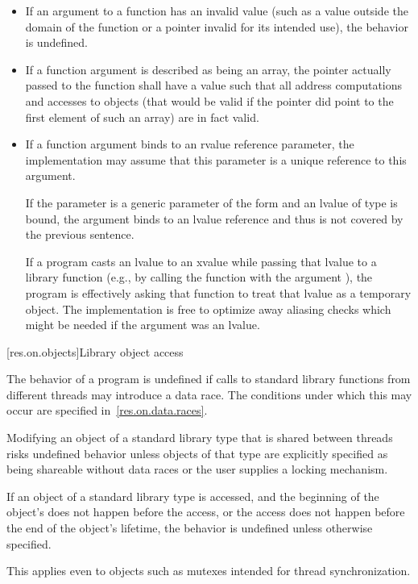 \begin{itemize}
\item
If an argument to a function has an invalid value (such
%
as a value outside the domain of the function or a pointer invalid for its
intended use), the behavior is undefined.
%

\item
If a function argument is described as being an array,
%
the pointer actually passed to the function shall have a value such that all
address computations and accesses to objects (that would be valid if the
pointer did point to the first element of such an array) are in fact valid.

\item
If a function argument binds to an rvalue reference parameter, the implementation may
assume that this parameter is a unique reference to this argument.
\begin{note}
If the parameter is a generic parameter of the form  and an lvalue of type
 is bound, the argument binds to an lvalue reference
and thus is not covered by the previous sentence.
\end{note}
\begin{note}
If a program casts
an lvalue to an xvalue while passing that lvalue to a library function
(e.g., by calling the function with the argument ), the program
is effectively asking that function to treat that lvalue as a temporary object.
The implementation
is free to optimize away aliasing checks which might be needed if the argument was
an lvalue.
\end{note}
\end{itemize}

[res.on.objects]{Library object access}

\pnum
The behavior of a program is undefined if calls to standard library functions from different
threads may introduce a data race. The conditions under which this may occur are specified
in~\ref{res.on.data.races}.
\begin{note}
Modifying an object of a standard library type that is
shared between threads risks undefined behavior unless objects of that type are explicitly
specified as being shareable without data races or the user supplies a locking mechanism.
\end{note}

\pnum
If an object of a standard library type is accessed, and
the beginning of the object's 
does not happen before the access, or
the access does not happen before the end of the object's lifetime,
the behavior is undefined unless otherwise specified.
\begin{note}
This applies even to objects such as mutexes intended for thread synchronization.
\end{note}

